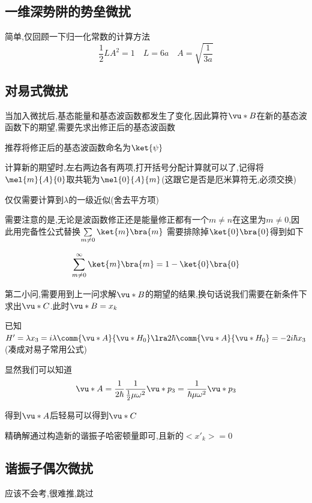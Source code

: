         \subsection{一维深势阱的势垒微扰}
            简单,仅回顾一下归一化常数的计算方法
            $$ \frac{1}{2} L A^{2} = 1  \quad L = 6 a \quad A = \sqrt{\frac{1}{3a}} $$
        
        \subsection{对易式微扰}
            当加入微扰后,基态能量和基态波函数都发生了变化,因此算符$\vu*{B}$在新的基态波函数下的期望,需要先求出修正后的基态波函数
            
            推荐将修正后的基态波函数命名为$\ket{\psi}$

            计算新的期望时,左右两边各有两项,打开括号分配计算就可以了,记得将$\mel{m}{A}{0}$取共轭为$\mel{0}{A}{m}$(这跟它是否是厄米算符无,必须交换)
            
            仅仅需要计算到$\lambda$的一级近似(舍去平方项)

            需要注意的是,无论是波函数修正还是能量修正都有一个$m \neq n$在这里为$m \neq 0$,因此用完备性公式替换$\sum\limits_{m\neq0}\ket{m}\bra{m}$
            需要排除掉$\ket{0}\bra{0}$得到如下
            
            $$ \sum\limits_{m\neq0}^{\infty}\ket{m}\bra{m} = 1 - \ket{0} \bra{0} $$

            第二小问,需要用到上一问求解$\vu*{B}$的期望的结果,换句话说我们需要在新条件下求出$\vu*{C}$.此时$\vu*{B} = x_{k}$
            
            已知$ H' = \lambda x_{3} = i \lambda \comm{\vu*{A}}{\vu*{H}_{0}} 
            \lra 2 \hbar \comm{\vu*{A}}{\vu*{H}_{{0}}} = - 2 i \hbar x_{3}$(凑成对易子常用公式)

            显然我们可以知道
            $$ \vu*{A} = \dfrac{1}{2\hbar} \dfrac{1}{\frac{1}{2}\mu \omega^{2} } \vu*{p}_{3} = \dfrac{1}{\hbar \mu \omega^{2}} \vu*{p}_{3} $$

            得到$\vu*{A}$后轻易可以得到$\vu*{C}$

            精确解通过构造新的谐振子哈密顿量即可,且新的$<x'_{k}> = 0$

        \subsection{谐振子偶次微扰}
            应该不会考,很难推,跳过

